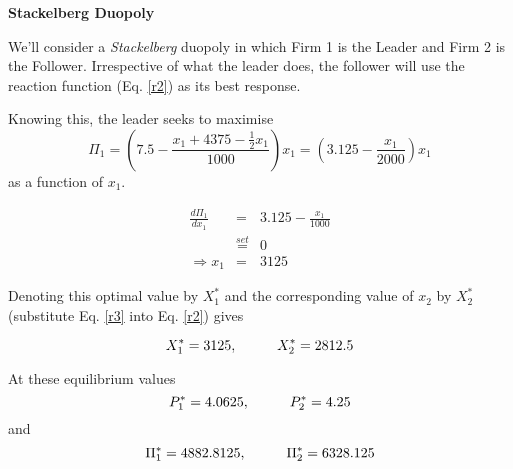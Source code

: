 \documentclass[12pt]{article}
\begin{document}
 \begin{center}
\textbf{Stackelberg Duopoly %
}
\end{center}
We'll consider a \textit{Stackelberg} duopoly in which Firm 1 is the Leader and Firm 2 is the Follower. Irrespective of what the leader does, the follower will use the reaction function (Eq. \ref{r2}) as its best response.

\newpage

Knowing this, the leader seeks to maximise $$ \Pi_1 = \left(7.5 - \frac{x_1 + 4375
 - \frac{1}{2} x_1 }{1000}\right)x_1  = \left( 3.125 - \frac{x_1}{2000}\right) x_1$$
as a function of $x_1$.

\begin{eqnarray}
 \frac{d \Pi_1} {d x_1} &=&3.125-\frac{x_1}{1000} \nonumber \\
 & \stackrel{set}{=} & 0 \nonumber \\
 \Rightarrow x_1 &=& 3125 \label{r3}
 \end{eqnarray}

 Denoting this optimal value by $X_1^*$ and the corresponding value of $x_2$ by $X_2^*$ (substitute Eq. \ref{r3} into Eq. \ref{r2}) gives

 $$ X_1^* = 3125, \hspace{10mm} X_2^* = 2812.5 $$

 At these equilibrium values
$$ P_1^* = 4.0625 , \hspace{10mm} P_2^*= 4.25$$
 and
 \begin{equation} \Pi_1^* = 4882.8125, \hspace{10mm} \Pi_2^* = 6328.125\label{sp} \end{equation}
\end{document}

